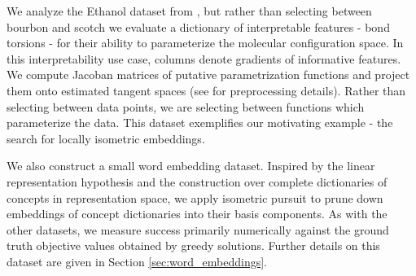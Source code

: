 We analyze the Ethanol dataset from \citet{Chmiela2018-at, Koelle2022-ju}, but rather than selecting between bourbon and scotch we evaluate a dictionary of interpretable features  - bond torsions - for their ability to parameterize the molecular configuration space.
In this interpretability use case, columns denote gradients of informative features.
We compute Jacoban matrices of putative parametrization functions and project them onto estimated tangent spaces (see \citet{Koelle2022-ju} for preprocessing details).
Rather than selecting between data points, we are selecting between functions which parameterize the data.
This dataset exemplifies our motivating example - the search for locally isometric embeddings.

We also construct a small word embedding dataset.
Inspired by the linear representation hypothesis \citep{Park2023-hq,Mikolov2013-lt } and the construction over complete dictionaries of concepts in representation space, we apply isometric pursuit to prune down embeddings of concept dictionaries into their basis components.
As with the other datasets, we measure success primarily numerically against the ground truth objective values obtained by greedy solutions.
Further details on this dataset are given in Section \ref{sec:word_embeddings}.


